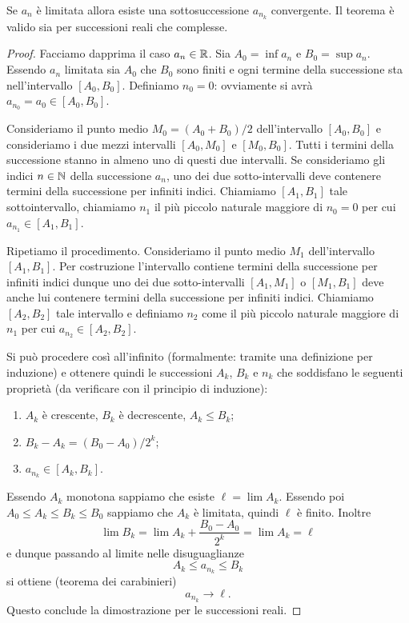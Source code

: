 \begin{theorem}\label{th:Bolzano}
\mymark{***}%
%
%
Se $a_n$ è limitata allora esiste una sottosuccessione
$a_{n_k}$ convergente. Il teorema è valido sia per successioni reali
che complesse.
\end{theorem}
%
\begin{proof}
Facciamo dapprima il caso $a_n\in \mathbb R$.
\mymark{***}
Sia $A_0=\inf a_n$ e $B_0=\sup a_n$. Essendo $a_n$ limitata
sia $A_0$
che $B_0$ sono finiti e ogni termine della successione sta
nell'intervallo $[A_0,B_0]$. Definiamo $n_0=0$: ovviamente si avrà $a_{n_0} = a_0 \in [A_0, B_0]$.

Consideriamo il punto medio $M_0 = (A_0+B_0)/2$ dell'intervallo $[A_0,B_0]$ e consideriamo i due mezzi intervalli $[A_0,M_0]$ e $[M_0,B_0]$. Tutti i termini della successione stanno in almeno
uno di questi due intervalli.
Se consideriamo gli indici $n\in \mathbb N$ della successione $a_n$, uno dei due sotto-intervalli deve contenere termini
della successione per infiniti indici.
Chiamiamo $[A_1, B_1]$
tale sottointervallo,
chiamiamo $n_1$ il più piccolo naturale maggiore di $n_0=0$
per cui $a_{n_1} \in [A_1,  B_1]$.

Ripetiamo il procedimento.
Consideriamo il punto medio $M_1$ dell'intervallo $[A_1,B_1]$.
Per costruzione l'intervallo contiene termini della successione
per infiniti indici dunque uno dei due sotto-intervalli $[A_1,M_1]$
o $[M_1,B_1]$ deve anche lui
contenere termini della successione per infiniti indici. Chiamiamo
$[A_2, B_2]$ tale intervallo e definiamo $n_2$ come il più piccolo
naturale maggiore di $n_1$ per cui $a_{n_2}\in [A_2, B_2]$.

Si può procedere così all'infinito (formalmente: tramite una definizione per induzione)
e ottenere quindi le successioni $A_k$, $B_k$ e $n_k$ che soddisfano le seguenti proprietà (da verificare con il principio di induzione):
\begin{enumerate}
\item $A_k$ è crescente, $B_k$ è decrescente, $A_k \le B_k$;
\item $B_k - A_k = (B_0-A_0)/2^k$;
\item $a_{n_k} \in [A_k, B_k]$.
\end{enumerate}

Essendo $A_k$ monotona sappiamo che esiste $\ell = \lim A_k$. Essendo poi $A_0 \le A_k \le B_k \le B_0$ sappiamo che $A_k$ è limitata, quindi $\ell$ è finito.
Inoltre
\[
 \lim B_k = \lim A_k + \frac{B_0-A_0}{2^k} = \lim A_k = \ell
 \]
 e dunque
passando al limite nelle disuguaglianze
\[
   A_k \le a_{n_k} \le B_k
\]
si ottiene (teorema dei carabinieri)
\[
  a_{n_k} \to \ell.
\]
Questo conclude la dimostrazione per le successioni reali.


\end{proof}
